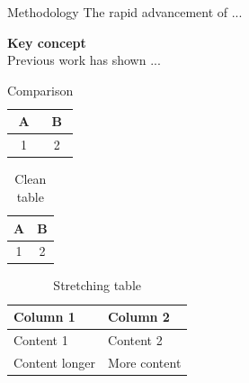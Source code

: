 \begin{block}{Methodology}
  The rapid advancement of ...

  \textbf{Key concept} \\
  Previous work has shown ...

  \begin{table}
    \centering
    \small
    \begin{tabular}{|c|c|}
      \hline
      A & B \\
      \hline
      1 & 2 \\
      \hline
    \end{tabular}
    \caption{Comparison}
  \end{table}

  \begin{table}
    \centering
    \small
    \begin{tabular}{cc}
      \toprule
      A & B \\
      \midrule
      1 & 2 \\
      \bottomrule
    \end{tabular}
    \caption{Clean table}
  \end{table}

  \begin{table}
    \centering
    \small
    \begin{tabularx}{\textwidth}{XX}
      \toprule
      Column 1 & Column 2 \\
      \midrule
      Content 1 & Content 2 \\
      Content longer & More content \\
      \bottomrule
    \end{tabularx}
    \caption{Stretching table}
  \end{table}
\end{block}